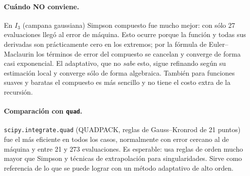 \documentclass[11pt,letterpaper]{report}
\begin{document}
\paragraph{Cuándo NO conviene.} En $I_3$ (campana gaussiana) Simpson compuesto fue mucho mejor:
con sólo 27 evaluaciones llegó al error de máquina. Esto ocurre porque la función y todas sus
derivadas son prácticamente cero en los extremos; por la fórmula de Euler--Maclaurin los términos
de error del compuesto se cancelan y converge de forma casi exponencial. El adaptativo, que no
\emph{sabe} esto, sigue refinando según su estimación local y converge sólo de forma algebraica.
También para funciones suaves y baratas el compuesto es más sencillo y no tiene el costo extra
de la recursión.

\paragraph{Comparación con \texttt{quad}.} \texttt{scipy.integrate.quad} (QUADPACK, reglas de
Gauss--Kronrod de 21 puntos) fue el más eficiente en todos los casos, normalmente con error cercano
al de máquina y entre 21 y 273 evaluaciones. Es esperable: usa reglas de orden mucho mayor que
Simpson y técnicas de extrapolación para singularidades. Sirve como referencia de lo que se puede
lograr con un método adaptativo de alto orden.
\end{document}
